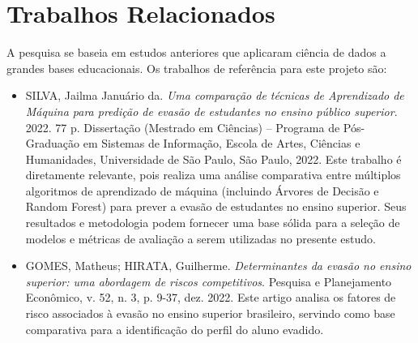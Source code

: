\documentclass[brazilian, english, spanish]{RBIEarticle}
\begin{document}
\section{Trabalhos Relacionados}
A pesquisa se baseia em estudos anteriores que aplicaram ciência de dados a grandes bases educacionais. Os trabalhos de referência para este projeto são:
\begin{itemize}
    \item SILVA, Jailma Januário da. \textit{Uma comparação de técnicas de Aprendizado de Máquina para predição de evasão de estudantes no ensino público superior}. 2022. 77 p. Dissertação (Mestrado em Ciências) – Programa de Pós-Graduação em Sistemas de Informação, Escola de Artes, Ciências e Humanidades, Universidade de São Paulo, São Paulo, 2022. Este trabalho é diretamente relevante, pois realiza uma análise comparativa entre múltiplos algoritmos de aprendizado de máquina (incluindo Árvores de Decisão e Random Forest) para prever a evasão de estudantes no ensino superior. Seus resultados e metodologia podem fornecer uma base sólida para a seleção de modelos e métricas de avaliação a serem utilizadas no presente estudo.
    \item GOMES, Matheus; HIRATA, Guilherme. \textit{Determinantes da evasão no ensino superior: uma abordagem de riscos competitivos}. Pesquisa e Planejamento Econômico, v. 52, n. 3, p. 9-37, dez. 2022. Este artigo analisa os fatores de risco associados à evasão no ensino superior brasileiro, servindo como base comparativa para a identificação do perfil do aluno evadido.

\end{itemize}
\end{document}
